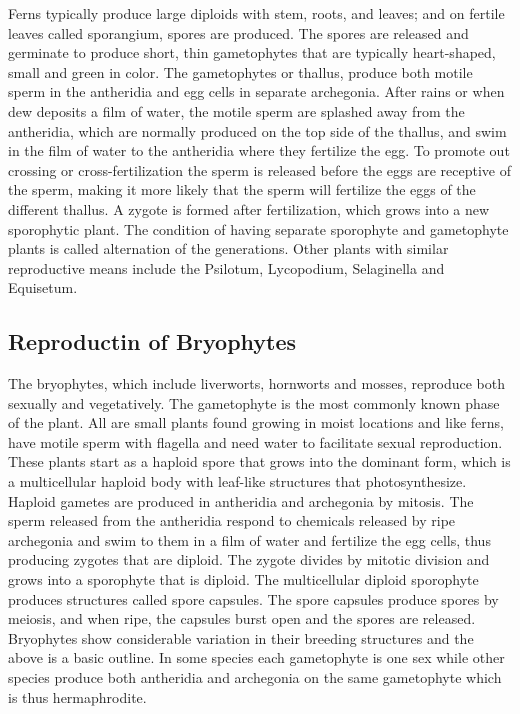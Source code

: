 Ferns typically produce large diploids with stem, roots, and leaves; and on fertile leaves called sporangium, spores are produced. The spores are released and germinate to produce short, thin gametophytes that are typically heart-shaped, small and green in color. The gametophytes or thallus, produce both motile sperm in the antheridia and egg cells in separate archegonia. After rains or when dew deposits a film of water, the motile sperm are splashed away from the antheridia, which are normally produced on the top side of the thallus, and swim in the film of water to the antheridia where they fertilize the egg. To promote out crossing or cross-fertilization the sperm is released before the eggs are receptive of the sperm, making it more likely that the sperm will fertilize the eggs of the different thallus. A zygote is formed after fertilization, which grows into a new sporophytic plant. The condition of having separate sporophyte and gametophyte plants is called alternation of the generations. Other plants with similar reproductive means include the Psilotum, Lycopodium, Selaginella and Equisetum.

\hypertarget{reproductin-of-bryophytes}{%
\subsection{Reproductin of Bryophytes}\label{reproductin-of-bryophytes}}

The bryophytes, which include liverworts, hornworts and mosses, reproduce both sexually and vegetatively. The gametophyte is the most commonly known phase of the plant. All are small plants found growing in moist locations and like ferns, have motile sperm with flagella and need water to facilitate sexual reproduction. These plants start as a haploid spore that grows into the dominant form, which is a multicellular haploid body with leaf-like structures that photosynthesize. Haploid gametes are produced in antheridia and archegonia by mitosis. The sperm released from the antheridia respond to chemicals released by ripe archegonia and swim to them in a film of water and fertilize the egg cells, thus producing zygotes that are diploid. The zygote divides by mitotic division and grows into a sporophyte that is diploid. The multicellular diploid sporophyte produces structures called spore capsules. The spore capsules produce spores by meiosis, and when ripe, the capsules burst open and the spores are released. Bryophytes show considerable variation in their breeding structures and the above is a basic outline. In some species each gametophyte is one sex while other species produce both antheridia and archegonia on the same gametophyte which is thus hermaphrodite.


